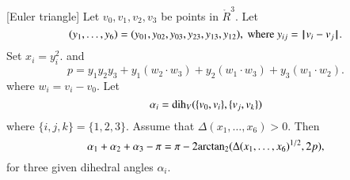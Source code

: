 \begin{lemma}[Euler triangle]\label{lemma:euler}
Let $v_0,v_1,v_2,v_3$ be points in $\ring{R}^3$. 
Let 
  $$(y_1,\ldots,y_6) =(y_{01},y_{02},y_{03},y_{23},y_{13},y_{12}),
   \text{ where } y_{ij}={\hskip0.1em|\hskip-0.15em|\hskip0.1em}v_i - v_j{\hskip0.1em|\hskip-0.15em|\hskip0.1em}.$$
Set
$x_i = y_i^2$.   
and
    $$
    p = y_1 y_2 y_3 + y_1 (w_2\cdot w_3) + y_2 (w_1\cdot w_3) + y_3
    (w_1\cdot w_2).
    $$
where $w_i = v_i- v_0$.
Let $$\alpha_i =\operatorname{dih}_V(\{v_0,v_i\},\{v_j,v_k\})$$
where $\{i,j,k\}=\{1,2,3\}$.
Assume that $\Delta(x_1,\ldots,x_6)>0$. 
Then
    $$
    \alpha_1+\alpha_2+\alpha_3 - \pi
     = {\pi} - 2{\operatorname{arctan_2}}({\Delta(x_1,\ldots,x_6)^{1/2}},{2 p}),
    $$
for three given dihedral angles $\alpha_i$.
\end{lemma}

